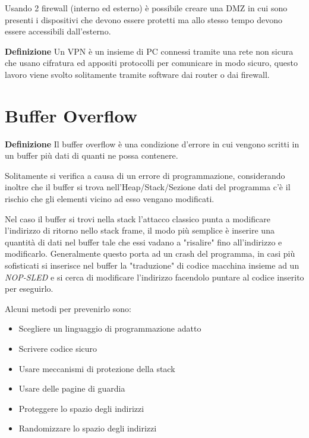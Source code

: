 \documentclass{article}
\newcommand{\df}[1]{\noindent\textbf{Definizione } #1.\newline}
\begin{document}
\newpage

\noindent Usando 2 firewall (interno ed esterno) è possibile creare una DMZ in cui sono presenti i dispositivi che devono essere protetti ma allo stesso tempo devono essere accessibili dall'esterno.\newline

\noindent\textbf{Definizione} Un VPN è un insieme di PC connessi tramite una rete non sicura che usano cifratura ed appositi protocolli per comunicare in modo sicuro, questo lavoro viene svolto solitamente tramite software dai router o dai firewall.\newline

\section{Buffer Overflow}

\df{Il buffer overflow è una condizione d'errore in cui vengono scritti in un buffer più dati di quanti ne possa contenere}

\noindent Solitamente si verifica a causa di un errore di programmazione, considerando inoltre che il buffer si trova nell'Heap/Stack/Sezione dati del programma c'è il rischio che gli elementi vicino ad esso vengano modificati.\newline

\noindent Nel caso il buffer si trovi nella stack l'attacco classico punta a modificare l'indirizzo di ritorno nello stack frame, il modo più semplice è inserire una quantità di dati nel buffer tale che essi vadano a "risalire" fino all'indirizzo e modificarlo. Generalmente questo porta ad un crash del programma, in casi più sofisticati si inserisce nel buffer la "traduzione" di codice macchina insieme ad un \textit{NOP-SLED} e si cerca di modificare l'indirizzo facendolo puntare al codice inserito per eseguirlo.\newline

\noindent Alcuni metodi per prevenirlo sono:
\begin{itemize}
    \item Scegliere un linguaggio di programmazione adatto
    \item Scrivere codice sicuro
    \item Usare meccanismi di protezione della stack
    \item Usare delle pagine di guardia
    \item Proteggere lo spazio degli indirizzi
    \item Randomizzare lo spazio degli indirizzi
\end{itemize}
\end{document}
